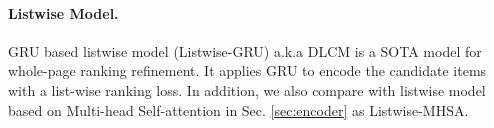 \paragraph{\textbf{Listwise Model.}}
GRU based listwise model (Listwise-GRU) a.k.a DLCM \cite{ai2018learning} is a SOTA model for whole-page ranking refinement.
It applies GRU \cite{chung2014empirical} to encode the candidate items with a list-wise ranking loss.
In addition, we also compare with listwise model based on Multi-head Self-attention in Sec. \ref{sec:encoder} as Listwise-MHSA.
